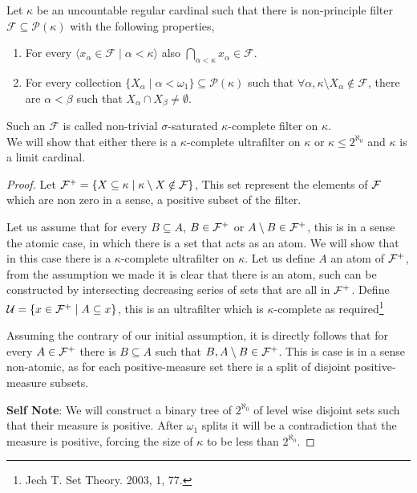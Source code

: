 \question{}
Let $\kappa$ be an uncountable regular cardinal such that there is non-principle filter $\mathcal{F} \subseteq \mathcal{P}(\kappa)$ with the following properties,
\begin{enumerate}
	\item For every $\langle x_\alpha \in \mathcal{F} \mid \alpha < \kappa \rangle$ also $\bigcap_{\alpha < \kappa} x_\alpha \in \mathcal{F}$.
	\item For every collection $\{ X_\alpha \mid \alpha < \omega_1 \} \subseteq \mathcal{P}(\kappa)$ such that $\forall \alpha, \kappa \setminus X_\alpha \notin \mathcal{F}$,
		there are $\alpha < \beta$ such that $X_\alpha \cap X_\beta \ne \emptyset$.
\end{enumerate}
Such an $\mathcal{F}$ is called non-trivial $\sigma$-saturated $\kappa$-complete filter on $\kappa$. \\
We will show that either there is a $\kappa$-complete ultrafilter on $\kappa$ or $\kappa \le 2^{\aleph_0}$ and $\kappa$ is a limit cardinal.
\begin{proof}
	Let $\mathcal{F}^+ = \{X \subseteq \kappa \mid \kappa \setminus X \notin \mathcal{F}\}$, This set represent the elements of $\mathcal{F}$ which are non zero in a sense, a positive subset of the filter.

	Let us assume that for every $B \subseteq A$, $B \in \mathcal{F}^+$ or $A \setminus B \in \mathcal{F}^+$, this is in a sense the atomic case, in which there is a set that acts as an atom.
	We will show that in this case there is a $\kappa$-complete ultrafilter on $\kappa$.
	Let us define $A$ an atom of $\mathcal{F}^+$, from the assumption we made it is clear that there is an atom, such can be constructed by intersecting decreasing series of sets that are all in $\mathcal{F}^+$.
	Define $\mathcal{U} = \{ x \in \mathcal{F}^+ \mid A \subseteq x \}$, this is an ultrafilter which is $\kappa$-complete as required\footnote{Jech T. Set Theory. 2003, 1, 77.}

	Assuming the contrary of our initial assumption, it is directly follows that for every $A \in \mathcal{F}^+$ there is $B \subseteq A$ such that $B, A \setminus B \in \mathcal{F}^+$.
	This is case is in a sense non-atomic, as for each positive-measure set there is a split of disjoint positive-measure subsets.

	\textbf{Self Note}:
	We will construct a binary tree of $2^{\aleph_0}$ of level wise disjoint sets such that their measure is positive. After $\omega_1$ splits it will be a contradiction that the measure is positive,
	forcing the size of $\kappa$ to be less than $2^{\aleph_0}$.
\end{proof}


